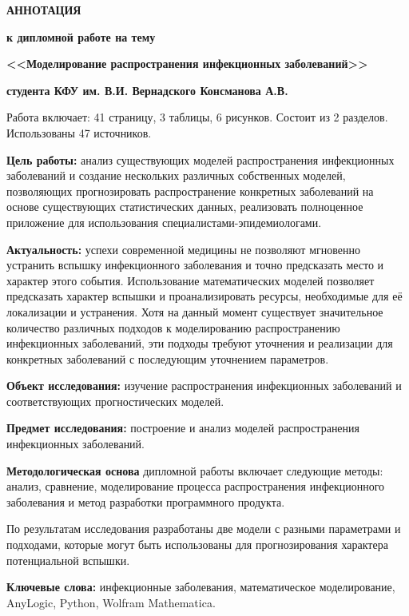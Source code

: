 \documentclass[a4paper,14pt,russian]{extreport}	%
\begin{document}
	\begin{center}
		\textbf{АННОТАЦИЯ}
		
		\textbf{к дипломной работе на тему}
		
		\textbf{<<Моделирование распространения инфекционных заболеваний>> }
		
		\textbf{студента КФУ им. В.И. Вернадского Консманова А.В.}
	\end{center}

Работа включает: 41 страницу, 3 таблицы, 6 рисунков. Состоит из 2 разделов. Использованы 47 источников. 

\textbf{Цель работы:} анализ существующих моделей распространения  инфекционных заболеваний и  создание нескольких различных собственных моделей, позволяющих прогнозировать распространение конкретных заболеваний на основе существующих статистических данных, реализовать полноценное приложение для использования  специалистами-эпидемиологами.

\textbf{Актуальность:} успехи современной медицины не позволяют мгновенно устранить вспышку инфекционного заболевания и точно предсказать место и характер этого события. Использование математических моделей позволяет предсказать характер вспышки и проанализировать ресурсы, необходимые для её локализации и устранения. Хотя на данный момент существует значительное  количество различных подходов к моделированию распространению инфекционных заболеваний, эти подходы требуют уточнения и реализации для конкретных заболеваний с последующим уточнением параметров.

\textbf{Объект исследования:} изучение распространения инфекционных заболеваний и соответствующих прогностических моделей.

\textbf{Предмет исследования:} построение и анализ моделей распространения инфекционных заболеваний.

\textbf{Методологическая основа} дипломной работы включает следующие методы: анализ, сравнение, моделирование процесса распространения инфекционного заболевания и метод разработки программного продукта.

По результатам исследования разработаны две модели с разными параметрами и подходами, которые могут быть использованы для  прогнозирования характера потенциальной вспышки.

\textbf{Ключевые слова:} инфекционные заболевания, математическое моделирование, AnyLogic, Python, Wolfram Mathematica.
\end{document}
